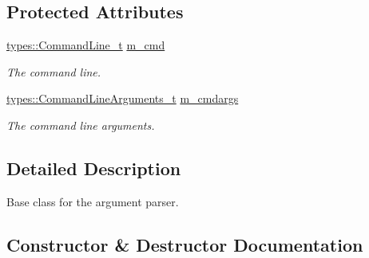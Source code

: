 \subsection*{Protected Attributes}
\begin{DoxyCompactItemize}
\item 
\mbox{\label{classcppargparse_1_1parser_1_1ArgumentParserBase_ab61aac285e831ef24598191816bed84d}} 
\hyperlink{types_8h_a80adf2418b7ce9fe616698efa7533ecf}{types\+::\+Command\+Line\+\_\+t} \hyperlink{classcppargparse_1_1parser_1_1ArgumentParserBase_ab61aac285e831ef24598191816bed84d}{m\+\_\+cmd}
\begin{DoxyCompactList}\small\item\em The command line. \end{DoxyCompactList}\item 
\mbox{\label{classcppargparse_1_1parser_1_1ArgumentParserBase_ac6fd162f8dfee569bb281ae5ef576d38}} 
\hyperlink{types_8h_a003c660afe2ee9c6cc39aea966e8926d}{types\+::\+Command\+Line\+Arguments\+\_\+t} \hyperlink{classcppargparse_1_1parser_1_1ArgumentParserBase_ac6fd162f8dfee569bb281ae5ef576d38}{m\+\_\+cmdargs}
\begin{DoxyCompactList}\small\item\em The command line arguments. \end{DoxyCompactList}\end{DoxyCompactItemize}


\subsection{Detailed Description}
Base class for the argument parser. 

\subsection{Constructor \& Destructor Documentation}
\mbox{\label{classcppargparse_1_1parser_1_1ArgumentParserBase_a91c5c101e21966fb8c04c094b04b8ba3}} 
